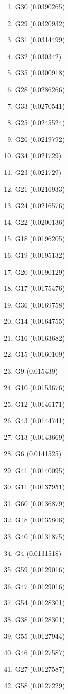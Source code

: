 \begin{enumerate}
\item G30 (0.0390265)
\item G29 (0.0320932)
\item G31 (0.0314499)
\item G32 (0.030342)
\item G35 (0.0300918)
\item G28 (0.0286266)
\item G33 (0.0270541)
\item G25 (0.0245524)
\item G26 (0.0219792)
\item G34 (0.021729)
\item G23 (0.021729)
\item G21 (0.0216933)
\item G24 (0.0216576)
\item G22 (0.0200136)
\item G18 (0.0196205)
\item G19 (0.0195132)
\item G20 (0.0190129)
\item G17 (0.0175476)
\item G36 (0.0169758)
\item G14 (0.0164755)
\item G16 (0.0163682)
\item G15 (0.0160109)
\item G9 (0.015439)
\item G10 (0.0153676)
\item G12 (0.0146171)
\item G43 (0.0144741)
\item G13 (0.0143669)
\item G6 (0.0141525)
\item G41 (0.0140095)
\item G11 (0.0137951)
\item G60 (0.0136879)
\item G48 (0.0135806)
\item G40 (0.0131875)
\item G4 (0.0131518)
\item G59 (0.0129016)
\item G47 (0.0129016)
\item G54 (0.0128301)
\item G38 (0.0128301)
\item G55 (0.0127944)
\item G46 (0.0127587)
\item G27 (0.0127587)
\item G58 (0.0127229)

\end{enumerate}
